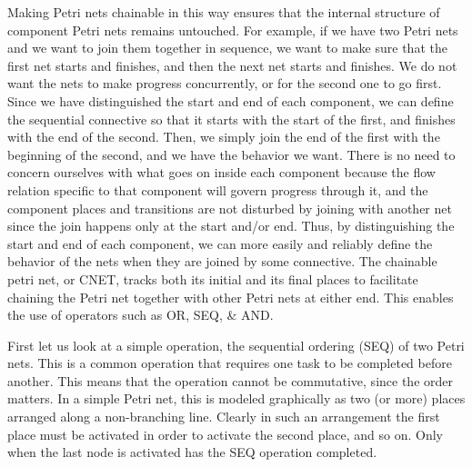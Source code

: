 Making Petri nets chainable in this way ensures that the internal structure of component Petri nets remains untouched. For example, if we have two Petri nets and we want to join them together in sequence, we want to make sure that the first net starts and finishes, and then the next net starts and finishes. We do not want the nets to make progress concurrently, or for the second one to go first. Since we have distinguished the start and end of each component, we can define the sequential connective so that it starts with the start of the first, and finishes with the end of the second. Then, we simply join the end of the first with the beginning of the second, and we have the behavior we want. There is no need to concern ourselves with what goes on inside each component because the flow relation specific to that component will govern progress through it, and the component places and transitions are not disturbed by joining with another net since the join happens only at the start and/or end. Thus, by distinguishing the start and end of each component, we can more easily and reliably define the behavior of the nets when they are joined by some connective. The chainable petri net, or CNET, tracks both its initial and its final places to facilitate chaining the Petri net together with other Petri nets at either end. This enables the use of operators such as OR, SEQ, \& AND.\\
\begin{example}
  \label{ex:SEQ-PN}
First let us look at a simple operation, the sequential ordering (SEQ) of two Petri nets. This is a common operation that requires one task to be completed before another. This means that the operation cannot be commutative, since the order matters. In a simple Petri net, this is modeled graphically as two (or more) places arranged along a non-branching line. Clearly in such an arrangement the first place must be activated in order to activate the second place, and so on. Only when the last node is activated has the SEQ operation completed.    
\end{example}
